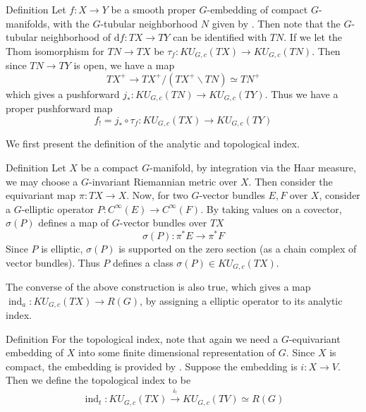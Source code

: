 \documentclass{beamer}
\DeclareMathOperator{\ind}{\mathrm{ind}}
\newcommand{\der}{\mathrm{d}}
\begin{document}
\begin{frame}
	\begin{block}{Definition}
		Let $f:X\to Y$ be a smooth proper $G$-embedding of compact $G$-manifolds, with the $G$-tubular neighborhood $N$ given by \cite{kankaanrinta2007equivariant}. Then note that the $G$-tubular neighborhood of $\der f:TX\to TY$ can be identified with $TN$. If we let the Thom isomorphism for $TN\to TX$ be $\tau_f:KU_{G,c}(TX)\to KU_{G,c}(TN)$. Then since $TN\to TY$ is open, we have a map 
		\[ TX^+\to TX^+/(TX^+\backslash TN)\simeq TN^+ \]
		which gives a pushforward $j_*:KU_{G,c}(TN)\to KU_{G,c}(TY)$. 
		Thus we have a proper pushforward map 
		\[ f_!=j_*\circ\tau_f:KU_{G,c}(TX)\to KU_{G,c}(TY) \]
	\end{block}
\end{frame}

\begin{frame}
	We first present the definition of the analytic and topological index. 
	\begin{block}{Definition}
		Let $X$ be a compact $G$-manifold, by integration via the Haar measure, we may choose a $G$-invariant Riemannian metric over $X$. Then consider the equivariant map $\pi:TX\to X$. Now, for two $G$-vector bundles $E,F$ over $X$, consider a $G$-elliptic operator $P:C^\infty(E)\to C^\infty(F)$. By taking values on a covector, $\sigma(P)$ defines a map of $G$-vector bundles over $TX$
		\[ \sigma(P):\pi^*E\to\pi^*F \]
		Since $P$ is elliptic, $\sigma(P)$ is supported on the zero section (as a chain complex of vector bundles). Thus $P$ defines a class $\sigma(P)\in KU_{G,c}(TX)$. 

		The converse of the above construction is also true, which gives a map $\ind_a:KU_{G,c}(TX)\to R(G)$, by assigning a elliptic operator to its analytic index. 
	\end{block}
\end{frame}

\begin{frame}
	\begin{block}{Definition}
		For the topological index, note that again we need a $G$-equivariant embedding of $X$ into some finite dimensional representation of $G$. Since $X$ is compact, the embedding is provided by \cite{palais1957imbedding}. Suppose the embedding is $i:X\to V$. Then we define the topological index to be 
		\[ \ind_t:KU_{G,c}(TX)\xrightarrow{i_!}KU_{G,c}(TV)\simeq R(G) \]
	\end{block}	
\end{frame}
\end{document}
